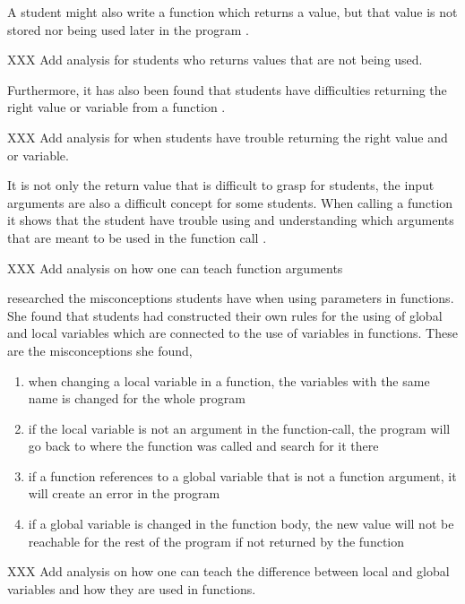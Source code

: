 A student might also write a function which returns a value, but that value is 
not stored nor being used later in the program 
\parencite{AltadmriBrown2015}. 

XXX Add analysis for students who returns values that are not being used. 


Furthermore, it has also been found that students have difficulties returning the right value or variable from a function 
\parencite{KumarVeerasamy2016}. 

XXX Add analysis for when students have trouble returning the right value and or variable. 



It is not only the return value that is difficult to grasp for students, the 
input arguments are also a difficult concept for some students. When calling a 
function it shows that the student have trouble using and understanding which 
arguments that are meant to be used in the function call 
\parencite{AltadmriBrown2015}. 

XXX Add analysis on how one can teach function arguments 

\Textcite{Fleury1991} researched the 
misconceptions students have when using parameters in functions.
She found that students had constructed their own rules for the using 
of global and local variables which are connected to the use of variables in 
functions. These are the misconceptions she found, 

\begin{enumerate}
    \item when changing a local variable in a function, the variables with the same name is changed for the whole program

    \item if the local variable is not an argument in the function-call, the program will go back to where the function was called and search for it there

    \item if a function references to a global variable that is not a function argument, it will create an error in the program

    \item if a global variable is changed in the function body, the new value will not be reachable for the rest of the program if not returned by the function
\end{enumerate}

XXX Add analysis on how one can teach the difference between local and global variables and how they are used in functions. 

